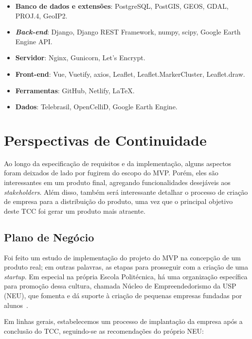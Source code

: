 \documentclass[]{politex}
\begin{document}
\begin{itemize}
\item \textbf{Banco de dados e extensões}: PostgreSQL, PostGIS, GEOS, GDAL,
PROJ.4, GeoIP2.
\item \textbf{\textit{Back-end}}: Django, Django REST Framework, numpy, scipy,
Google Earth Engine API.
\item \textbf{Servidor}: Nginx, Gunicorn, Let's Encrypt.
\item \textbf{Front-end}: Vue, Vuetify, axios, Leaflet, Leaflet.MarkerCluster,
Leaflet.draw.
\item \textbf{Ferramentas}: GitHub, Netlify, LaTeX.
\item \textbf{Dados}: Telebrasil, OpenCelliD, Google Earth Engine.
\end{itemize}

\section{Perspectivas de Continuidade}

Ao longo da especificação de requisitos e da implementação, alguns aspectos
foram deixados de lado por fugirem do escopo do MVP. Porém, eles são
interessantes em um produto final, agregando funcionalidades desejáveis aos
\textit{stakeholders}. Além disso, também será interessante detalhar o processo
de criação de empresa para a distribuição do produto, uma vez que o principal
objetivo deste TCC foi gerar um produto mais atraente.

\subsection{Plano de Negócio}

Foi feito um estudo de implementação do projeto do MVP na concepção de um
produto real; em outras palavras, as etapas para prosseguir com a criação de uma
\textit{startup}. Em especial na própria Escola Politécnica, há uma organização
específica para promoção dessa cultura, chamada Núcleo de Empreendedorismo da
USP (NEU), que fomenta e dá suporte à criação de pequenas empresas fundadas por
alunos~\cite{neu}.

Em linhas gerais, estabelecemos um processo de implantação da empresa após a
conclusão do TCC, seguindo-se as recomendações do próprio NEU:
\end{document}
